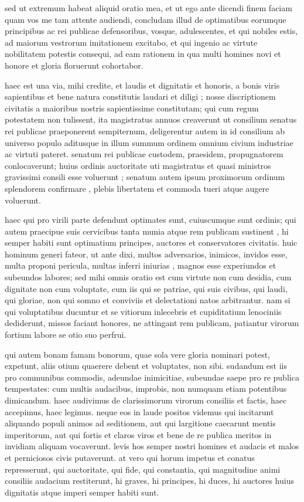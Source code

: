  sed ut extremum habeat aliquid oratio mea, et ut ego ante dicendi finem faciam quam vos me tam attente audiendi, concludam illud de optimatibus eorumque principibus ac rei publicae defensoribus, vosque, adulescentes, et qui nobiles estis, ad maiorum vestrorum imitationem excitabo, et qui ingenio ac virtute nobilitatem potestis consequi, ad eam rationem in qua multi homines novi et honore et gloria floruerunt cohortabor.

 haec est una via, mihi credite, et laudis et dignitatis et honoris, a bonis viris sapientibus et bene natura constitutis laudari et diligi ; nosse discriptionem civitatis a maioribus nostris sapientissime constitutam; qui cum regum potestatem non tulissent, ita magistratus annuos creaverunt ut consilium senatus rei publicae praeponerent sempiternum, deligerentur autem in id consilium ab universo populo aditusque in illum summum ordinem omnium civium industriae ac virtuti pateret. senatum rei publicae custodem, praesidem, propugnatorem conlocaverunt; huius ordinis auctoritate uti magistratus et quasi ministros gravissimi consili esse voluerunt ; senatum autem ipsum proximorum ordinum splendorem confirmare , plebis libertatem et commoda tueri atque augere voluerunt.

 haec qui pro virili parte defendunt optimates sunt, cuiuscumque sunt ordinis; qui autem praecipue suis cervicibus tanta munia atque rem publicam sustinent , hi semper habiti sunt optimatium principes, auctores et conservatores civitatis. huic hominum generi fateor, ut ante dixi, multos adversarios, inimicos, invidos esse, multa proponi pericula, multas inferri iniurias , magnos esse experiundos et subeundos labores; sed mihi omnis oratio est cum virtute non cum desidia, cum dignitate non cum voluptate, cum iis qui se patriae, qui suis civibus, qui laudi, qui gloriae, non qui somno et conviviis et delectationi natos arbitrantur. nam si qui voluptatibus ducuntur et se vitiorum inlecebris et cupiditatium lenociniis dediderunt, missos faciant honores, ne attingant rem publicam, patiantur virorum fortium labore se otio suo perfrui.

 qui autem bonam famam bonorum, quae sola vere gloria nominari potest, expetunt, aliis otium quaerere debent et voluptates, non sibi. sudandum est iis pro communibus commodis, adeundae inimicitiae, subeundae saepe pro re publica tempestates: cum multis audacibus, improbis, non numquam etiam potentibus dimicandum. haec audivimus de clarissimorum virorum consiliis et factis, haec accepimus, haec legimus. neque eos in laude positos videmus qui incitarunt aliquando populi animos ad seditionem, aut qui largitione caecarunt mentis imperitorum, aut qui fortis et claros viros et bene de re publica meritos in invidiam aliquam vocaverunt. levis hos semper nostri homines et audacis et malos et perniciosos civis putaverunt. at vero qui horum impetus et conatus represserunt, qui auctoritate, qui fide, qui constantia, qui magnitudine animi consiliis audacium restiterunt, hi graves, hi principes, hi duces, hi auctores huius dignitatis atque imperi semper habiti sunt.

